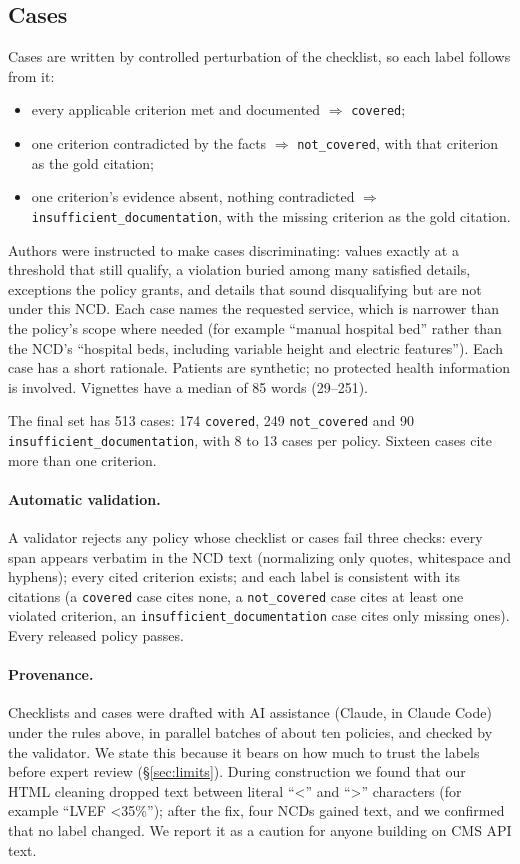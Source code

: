 \documentclass[11pt]{article}
\newcommand{\cov}{\texttt{covered}}
\newcommand{\ncov}{\texttt{not\_covered}}
\newcommand{\insuf}{\texttt{insufficient\_documentation}}
\begin{document}
\subsection{Cases}
Cases are written by controlled perturbation of the checklist, so each label follows from it:
\begin{itemize}[leftmargin=*,itemsep=1pt]
  \item every applicable criterion met and documented $\Rightarrow$ \cov{};
  \item one criterion contradicted by the facts $\Rightarrow$ \ncov{}, with that criterion as the
    gold citation;
  \item one criterion's evidence absent, nothing contradicted $\Rightarrow$ \insuf{}, with the
    missing criterion as the gold citation.
\end{itemize}
Authors were instructed to make cases discriminating: values exactly at a threshold that still
qualify, a violation buried among many satisfied details, exceptions the policy grants, and
details that sound disqualifying but are not under this NCD. Each case names the requested
service, which is narrower than the policy's scope where needed (for example ``manual hospital
bed'' rather than the NCD's ``hospital beds, including variable height and electric
features''). Each case has a short rationale.
Patients are synthetic; no protected health information is involved. Vignettes have a median of
85 words (29--251).

The final set has 513 cases: 174 \cov{}, 249 \ncov{} and 90 \insuf{}, with 8 to 13 cases per
policy. Sixteen cases cite more than one criterion.

\paragraph{Automatic validation.} A validator rejects any policy whose checklist or cases fail
three checks: every span appears verbatim in the NCD text (normalizing only quotes, whitespace and
hyphens); every cited criterion exists; and each label is consistent with its citations (a
\cov{} case cites none, a \ncov{} case cites at least one violated criterion, an \insuf{} case
cites only missing ones). Every released policy passes.

\paragraph{Provenance.} Checklists and cases were drafted with AI assistance (Claude, in Claude
Code) under the rules above, in parallel batches of about ten policies, and checked by the
validator. We state this because it bears on how much to trust the labels before expert review
(\S\ref{sec:limits}). During construction we found that our HTML cleaning dropped text between
literal ``<'' and ``>'' characters (for example ``LVEF <35\%''); after the fix, four NCDs gained
text, and we confirmed that no label changed. We report it as a caution for anyone building on
CMS API text.
\end{document}
